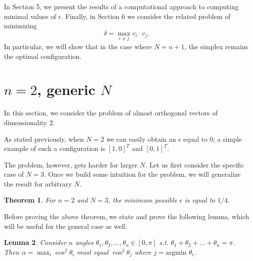 \documentclass[11pt,letterpaper,twoside,english]{article}
\theoremstyle{theorem}
\newtheorem{theorem}{Theorem}[section]
\newtheorem{lemma}[theorem]{Lemma}
\theoremstyle{remark}
\begin{document}
In Section 5, we present the results of a computational approach to computing minimal values of $\epsilon$. Finally, in Section 6 we consider the related problem of minimizing 
\[\delta=\max_{i\neq j}v_i\cdot v_j.\]
In particular, we will show that in the case where $N=n+1$, the simplex remains the optimal configuration.

\section{$n=2$, generic $N$}
In this section, we consider the problem of almost orthogonal vectors of dimensionality $2$.

As stated previously, when $N=2$ we can easily obtain an $\epsilon$ equal to $0$; a simple example of such a configuration is $[1, 0]^T$ and $[0, 1]^T$. 

The problem, however, gets harder for larger $N$. Let us first consider the specific case of $N=3$. Once we build some intuition for the problem, we will generalize the result for arbitrary $N$.

\begin{theorem}
For $n=2$ and $N=3$, the minimum possible $\epsilon$ is equal to $1/4$.
\end{theorem}

Before proving the above theorem, we state and prove the following lemma, which will be useful for the general case as well.

\begin{lemma}
Consider $n$ angles $\theta_1, \theta_2, \ldots, \theta_n \in [0, \pi]$ s.t. $\theta_1 + \theta_2 + \ldots + \theta_n = \pi$. Then $\alpha = \max_i \cos^2 \theta_i$ must equal $\cos^2 \theta_j$ where $j = \text{argmin }\theta_i$.
\end{lemma}
\end{document}
